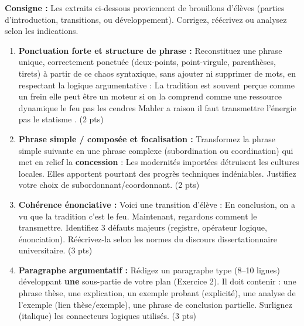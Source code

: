 \documentclass[11pt]{article}
\begin{document}
\begin{exercice}
\textbf{Consigne :} Les extraits ci-dessous proviennent de brouillons d'élèves (parties d'introduction, transitions, ou développement). Corrigez, réécrivez ou analysez selon les indications.

\begin{enumerate}
    \item \textbf{Ponctuation forte et structure de phrase :} Reconstituez une phrase unique, correctement ponctuée (deux-points, point-virgule, parenthèses, tirets) à partir de ce chaos syntaxique, sans ajouter ni supprimer de mots, en respectant la logique argumentative : 
    \og La tradition est souvent perçue comme un frein elle peut être un moteur si on la comprend comme une ressource dynamique le feu pas les cendres Mahler a raison il faut transmettre l'énergie pas le statisme \fg{}. (2 pts)
    
    \item \textbf{Phrase simple / composée et focalisation :} Transformez la phrase simple suivante en une phrase complexe (subordination ou coordination) qui met en relief la \textbf{concession} : \og Les modernités importées détruisent les cultures locales. Elles apportent pourtant des progrès techniques indéniables. \fg{} Justifiez votre choix de subordonnant/coordonnant. (2 pts)
    
    \item \textbf{Cohérence énonciative :} Voici une transition d'élève : \og En conclusion, on a vu que la tradition c'est le feu. Maintenant, regardons comment le transmettre. \fg{} Identifiez 3 défauts majeurs (registre, opérateur logique, énonciation). Réécrivez-la selon les normes du discours dissertationnaire universitaire. (3 pts)
    
    \item \textbf{Paragraphe argumentatif :} Rédigez un paragraphe type (8--10 lignes) développant \textbf{une} sous-partie de votre plan (Exercice 2). Il doit contenir : une phrase thèse, une explication, un exemple probant (explicité), une analyse de l'exemple (lien thèse/exemple), une phrase de conclusion partielle. Surlignez (italique) les connecteurs logiques utilisés. (3 pts)
\end{enumerate}
\end{exercice}
\end{document}
